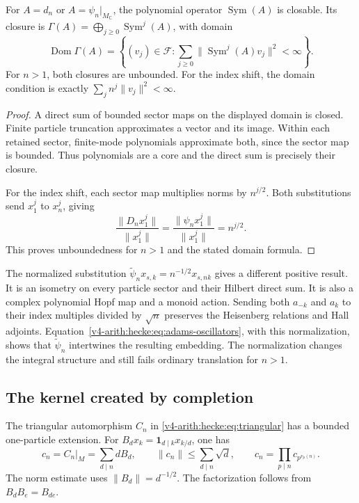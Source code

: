 \begin{proposition}
\label{v4-arith:hecke:prop:fock-closure}
For $A=d_n$ or $A=\psi_n|_{M_{\mathbb C}}$, the polynomial operator
$\operatorname{Sym}(A)$ is closable.
Its closure is $\Gamma(A)=\bigoplus_{j\geq0}\operatorname{Sym}^j(A)$,
with domain
\[
 \operatorname{Dom}\Gamma(A)=
 \left\{(v_j)\in\mathcal F:
       \sum_{j\geq0}\|\operatorname{Sym}^j(A)v_j\|^2<\infty\right\}.
\]
For $n>1$, both closures are unbounded.
For the index shift, the domain condition is exactly
$\sum_jn^j\|v_j\|^2<\infty$.
\end{proposition}
\begin{proof}
A direct sum of bounded sector maps on the displayed domain is closed.
Finite particle truncation approximates a vector and its image.
Within each retained sector, finite-mode polynomials approximate
both, since the sector map is bounded.
Thus polynomials are a core and the direct sum is precisely their closure.

For the index shift, each sector map multiplies norms by $n^{j/2}$.
Both substitutions send $x_1^j$ to $x_n^j$, giving
\[
 \frac{\|D_nx_1^j\|}{\|x_1^j\|}
 =\frac{\|\psi_nx_1^j\|}{\|x_1^j\|}=n^{j/2}.
\]
This proves unboundedness for $n>1$ and the stated domain formula.
\end{proof}

The normalized substitution
$\widetilde\psi_nx_{s,k}=n^{-1/2}x_{s,nk}$ gives a different positive result.
It is an isometry on every particle sector and their Hilbert direct sum.
It is also a complex polynomial Hopf map and a monoid action.
Sending both $a_{-k}$ and $a_k$ to their index multiples divided
by $\sqrt n$ preserves the Heisenberg relations and Hall adjoints.
Equation~\eqref{v4-arith:hecke:eq:adams-oscillators}, with this normalization,
shows that $\widetilde\psi_n$ intertwines the resulting embedding.
The normalization changes the integral structure and still fails
ordinary translation for $n>1$.

\subsection{The kernel created by completion}

The triangular automorphism $C_n$ in
\eqref{v4-arith:hecke:eq:triangular} has a bounded one-particle extension.
For $B_dx_k=\mathbf1_{d\mid k}x_{k/d}$, one has
\[
 c_n=C_n|_M=\sum_{d\mid n}dB_d,
 \qquad \|c_n\|\leq\sum_{d\mid n}\sqrt d,
 \qquad c_n=\prod_{p\mid n}c_{p^{v_p(n)}}.
\]
The norm estimate uses $\|B_d\|=d^{-1/2}$.
The factorization follows from $B_dB_e=B_{de}$.

